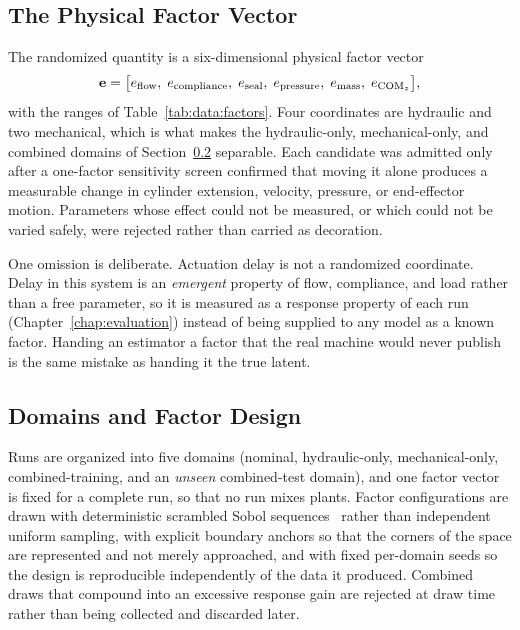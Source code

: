 \subsection{The Physical Factor Vector}
\label{sec:data:factors}

The randomized quantity is a six-dimensional physical factor vector
%
\begin{equation}
  \label{eq:data:factorvec}
  \factorvec = \bigl[
    e_{\mathrm{flow}},\;
    e_{\mathrm{compliance}},\;
    e_{\mathrm{seal}},\;
    e_{\mathrm{pressure}},\;
    e_{\mathrm{mass}},\;
    e_{\mathrm{COM}_z}
  \bigr],
\end{equation}
%
with the ranges of Table~\ref{tab:data:factors}. Four coordinates are
hydraulic and two mechanical, which is what makes the hydraulic-only,
mechanical-only, and combined domains of
Section~\ref{sec:data:domains} separable. Each candidate was admitted
only after a one-factor sensitivity screen confirmed that moving it
alone produces a measurable change in cylinder extension, velocity,
pressure, or end-effector motion. Parameters whose effect could not be
measured, or which could not be varied safely, were rejected rather than
carried as decoration.



One omission is deliberate. Actuation delay is not a
randomized coordinate. Delay in this system is an \emph{emergent}
property of flow, compliance, and load rather than a free parameter, so
it is measured as a response property of each run
(Chapter~\ref{chap:evaluation}) instead of being supplied to any model
as a known factor. Handing an estimator a factor that the real machine
would never publish is the same mistake as handing it the true latent.

\subsection{Domains and Factor Design}
\label{sec:data:domains}

Runs are organized into five domains
(nominal, hydraulic-only, mechanical-only, combined-training, and an
\emph{unseen} combined-test domain), and one factor vector is fixed for a complete run, so that no
run mixes plants. Factor configurations are drawn with deterministic
scrambled Sobol sequences~\cite{sobol1967distribution} rather than
independent uniform sampling, with explicit boundary anchors so that the
corners of the space are represented and not merely approached, and with
fixed per-domain seeds so the design is reproducible independently of
the data it produced. Combined draws that compound into an excessive
response gain are rejected at draw time rather than being collected and
discarded later.

